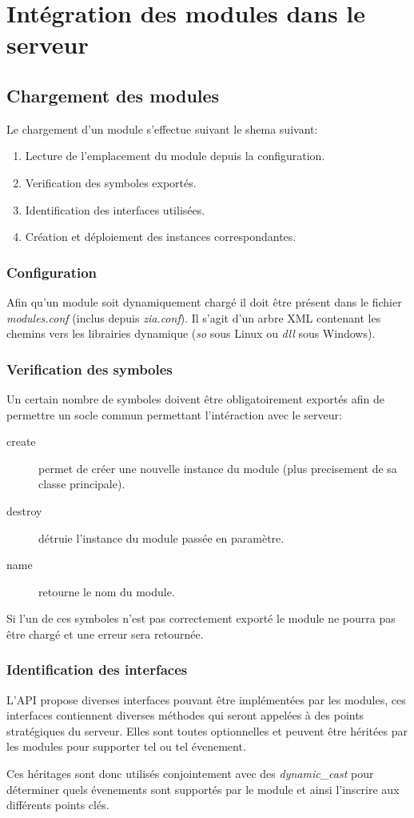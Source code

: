 \chapter{Intégration des modules dans le serveur}
\section{Chargement des modules}
    Le chargement d'un module s'effectue suivant le shema suivant:
    \begin{enumerate}
        \item Lecture de l'emplacement du module depuis la configuration.
        \item Verification des symboles exportés.
        \item Identification des interfaces utilisées.
        \item Création et déploiement des instances correspondantes.
    \end{enumerate}
    
    \subsection{Configuration}
    Afin qu'un module soit dynamiquement chargé il doit être présent dans le fichier \textit{modules.conf} (inclus depuis \textit{zia.conf}). Il s'agit d'un arbre XML contenant les chemins vers les librairies dynamique (\textit{so} sous Linux ou \textit{dll} sous Windows).
    
    \subsection{Verification des symboles}
    Un certain nombre de symboles doivent être obligatoirement exportés afin de permettre un socle commun permettant l'intéraction avec le serveur:
    \begin{description}
        \item[create] permet de créer une nouvelle instance du module (plus precisement de sa classe principale).
        \item[destroy] détruie l'instance du module passée en paramètre.
        \item[name] retourne le nom du module.
    \end{description}
    Si l'un de ces symboles n'est pas correctement exporté le module ne pourra pas être chargé et une erreur sera retournée.

    \subsection{Identification des interfaces}
    L'API propose diverses interfaces pouvant être implémentées par les modules, ces interfaces contiennent diverses méthodes qui seront appelées à des points stratégiques du serveur. Elles sont toutes optionnelles et peuvent être héritées par les modules pour supporter tel ou tel évenement.


    Ces héritages sont donc utilisés conjointement avec des \textit{dynamic\_cast} pour déterminer quels évenements sont supportés par le module et ainsi l'inscrire aux différents points clés. 
